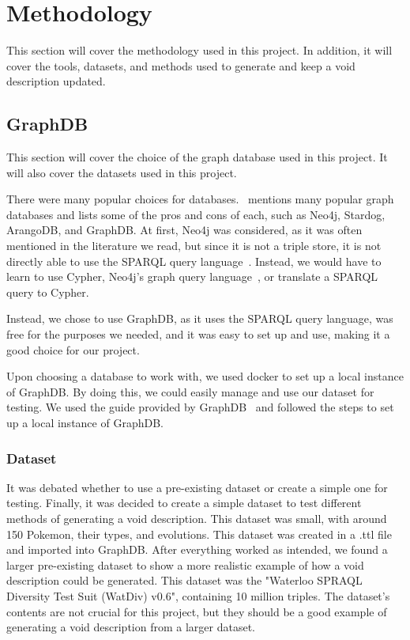 \section{Methodology}\label{sec:methodology}

This section will cover the methodology used in this project. In addition, it will cover the tools, datasets, and methods used to generate and keep a \gls{void} description updated.

\subsection{GraphDB}\label{sec:graphdb}
This section will cover the choice of the graph database used in this project. It will also cover the datasets used in this project.

There were many popular choices for databases.~\cite{best-graph-databases} mentions many popular graph databases and lists some of the pros and cons of each, such as Neo4j, Stardog, ArangoDB, and GraphDB. At first, Neo4j was considered, as it was often mentioned in the literature we read, but since it is not a triple store, it is not directly able to use the SPARQL query language~\cite{neo4j:-a-reasonable-RDF-graph-database}. Instead, we would have to learn to use Cypher, Neo4j's graph query language~\cite{cypher-query-language}, or translate a SPARQL query to Cypher.

Instead, we chose to use GraphDB, as it uses the SPARQL query language, was free for the purposes we needed, and it was easy to set up and use, making it a good choice for our project.

Upon choosing a database to work with, we used docker to set up a local instance of GraphDB. By doing this, we could easily manage and use our dataset for testing. We used the guide provided by GraphDB~\cite{docker-graphDB} and followed the steps to set up a local instance of GraphDB.

\subsubsection{Dataset}\label{sec:dataset}
It was debated whether to use a pre-existing dataset or create a simple one for testing. Finally, it was decided to create a simple dataset to test different methods of generating a \gls{void} description. This dataset was small, with around 150 Pokemon, their types, and evolutions. This dataset was created in a .ttl file and imported into GraphDB.
After everything worked as intended, we found a larger pre-existing dataset to show a more realistic example of how a \gls{void} description could be generated. This dataset was the "Waterloo SPRAQL Diversity Test Suit (WatDiv) v0.6", containing 10 million triples. The dataset's contents are not crucial for this project, but they should be a good example of generating a void description from a larger dataset.

